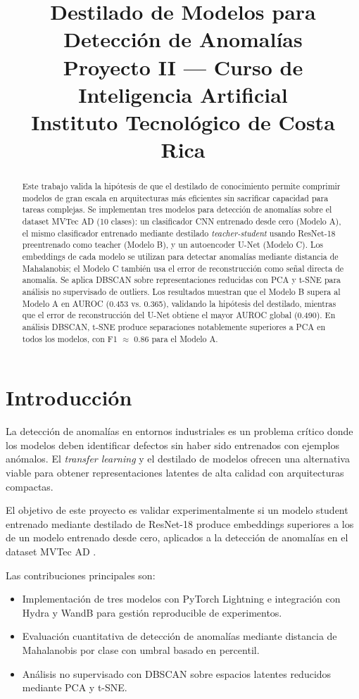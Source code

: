 \documentclass[conference]{IEEEtran}
\title{Destilado de Modelos para Detección de Anomalías\\
\large Proyecto II --- Curso de Inteligencia Artificial\\
Instituto Tecnológico de Costa Rica}
\author{
  \IEEEauthorblockN{Allan B}
  \IEEEauthorblockA{Escuela de Ingeniería en Computación\\
  Instituto Tecnológico de Costa Rica\\
  adbyb.es@gmail.com\\
  \url{https://github.com/AllanDBB/nomaly-detection-distillation}}
}
\begin{document}
\maketitle

\begin{abstract}
Este trabajo valida la hipótesis de que el destilado de conocimiento permite
comprimir modelos de gran escala en arquitecturas más eficientes sin sacrificar
capacidad para tareas complejas. Se implementan tres modelos para detección de
anomalías sobre el dataset MVTec AD (10 clases): un clasificador CNN entrenado
desde cero (Modelo A), el mismo clasificador entrenado mediante destilado
\textit{teacher-student} usando ResNet-18 preentrenado como teacher (Modelo B),
y un autoencoder U-Net (Modelo C). Los embeddings de cada modelo se utilizan
para detectar anomalías mediante distancia de Mahalanobis; el Modelo C también
usa el error de reconstrucción como señal directa de anomalía. Se aplica DBSCAN
sobre representaciones reducidas con PCA y t-SNE para análisis no supervisado de
outliers. Los resultados muestran que el Modelo B supera al Modelo A en AUROC
(0.453 vs. 0.365), validando la hipótesis del destilado, mientras que el error
de reconstrucción del U-Net obtiene el mayor AUROC global (0.490). En análisis
DBSCAN, t-SNE produce separaciones notablemente superiores a PCA en todos los
modelos, con F1 $\approx$ 0.86 para el Modelo A.
\end{abstract}

\section{Introducción}

La detección de anomalías en entornos industriales es un problema crítico donde
los modelos deben identificar defectos sin haber sido entrenados con ejemplos
anómalos. El \textit{transfer learning} y el destilado de modelos ofrecen una
alternativa viable para obtener representaciones latentes de alta calidad con
arquitecturas compactas.

El objetivo de este proyecto es validar experimentalmente si un modelo student
entrenado mediante destilado de ResNet-18 produce embeddings superiores a los
de un modelo entrenado desde cero, aplicados a la detección de anomalías en
el dataset MVTec AD \cite{bergmann2019mvtec}.

Las contribuciones principales son:
\begin{itemize}
  \item Implementación de tres modelos con PyTorch Lightning e integración con
        Hydra y WandB para gestión reproducible de experimentos.
  \item Evaluación cuantitativa de detección de anomalías mediante distancia
        de Mahalanobis por clase con umbral basado en percentil.
  \item Análisis no supervisado con DBSCAN sobre espacios latentes reducidos
        mediante PCA y t-SNE.
\end{itemize}
\end{document}
